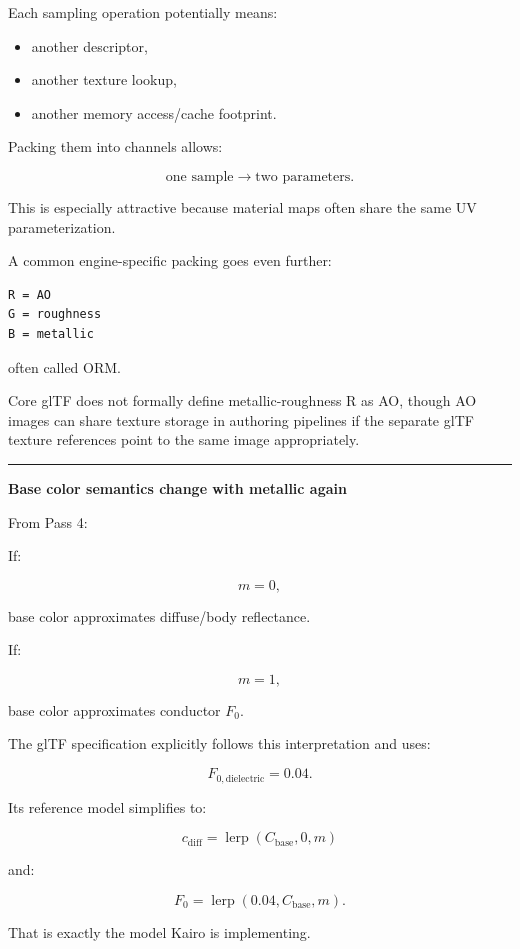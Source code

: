 Each sampling operation potentially means:

\begin{itemize}
\tightlist
\item
  another descriptor,
\item
  another texture lookup,
\item
  another memory access/cache footprint.
\end{itemize}

Packing them into channels allows:

\[
\text{one sample}
\rightarrow
\text{two parameters}.
\]

This is especially attractive because material maps often share the same UV parameterization.

A common engine-specific packing goes even further:

\begin{verbatim}
R = AO
G = roughness
B = metallic
\end{verbatim}

often called ORM.

Core glTF does not formally define metallic-roughness R as AO, though AO images can share texture storage in authoring pipelines if the separate glTF texture references point to the same image appropriately.

\begin{center}\rule{0.5\linewidth}{0.5pt}\end{center}

\textbf{Base color semantics change with metallic again}

From Pass 4:

If:

\[
m=0,
\]

base color approximates diffuse/body reflectance.

If:

\[
m=1,
\]

base color approximates conductor \(F_0\).

The glTF specification explicitly follows this interpretation and uses:

\[
F_{0,\text{dielectric}}=0.04.
\]

Its reference model simplifies to:

\[
c_{\text{diff}}
=
\operatorname{lerp}(C_{\text{base}},0,m)
\]

and:

\[
F_0=
\operatorname{lerp}(0.04,C_{\text{base}},m).
\]

That is exactly the model Kairo is implementing.

